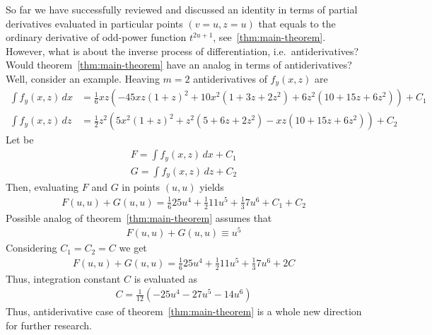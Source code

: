 ﻿So far we have successfully reviewed and discussed an identity in terms of partial derivatives evaluated in
particular points $(v=u, z=u)$ that equals to the ordinary derivative of odd-power function $t^{2u+1}$,
see~\eqref{thm:main-theorem}.
However, what is about the inverse process of differentiation, i.e.\ antiderivatives?
Would theorem~\eqref{thm:main-theorem} have an analog in terms of antiderivatives?
Well, consider an example.
Heaving $m=2$ antiderivatives of $f_y(x,z)$ are
\begin{align*}
    \int f_y(x,z) \, dx &= \frac{1}{6} x z (-45 x z (1 + z)^2 + 10 x^2 (1 + 3 z + 2 z^2) +
    6 z^2 (10 + 15 z + 6 z^2))  + C_1 \\
    \int f_y(x,z) \, dz &= \frac{1}{2} z^2 (5 x^2 (1 + z)^2 + z^2 (5 + 6 z + 2 z^2) -
    x z (10 + 15 z + 6 z^2)) + C_2
\end{align*}
Let be
\begin{align*}
    F = \int f_y(x,z) \, dx + C_1 \\
    G = \int f_y(x,z) \, dz + C_2
\end{align*}
Then, evaluating $F$ and $G$ in points $(u,u)$ yields
\begin{align*}
    F(u, u) + G(u, u) = \frac{1}{6} 25 u^4 + \frac{1}{2} 11 u^5 + \frac{1}{3} 7 u^6 + C_1 + C_2
\end{align*}
Possible analog of theorem~\eqref{thm:main-theorem} assumes that
\begin{align*}
    F(u, u) + G(u, u) \equiv u^5
\end{align*}
Considering $C_1=C_2=C$ we get
\begin{align*}
    F(u, u) + G(u, u) = \frac{1}{6} 25 u^4 + \frac{1}{2} 11 u^5 + \frac{1}{3} 7 u^6 + 2C
\end{align*}
Thus, integration constant $C$ is evaluated as
\begin{align*}
    C = \frac{1}{12} (-25 u^4 - 27 u^5 - 14 u^6)
\end{align*}
Thus, antiderivative case of theorem~\eqref{thm:main-theorem} is a whole new direction for further research.

